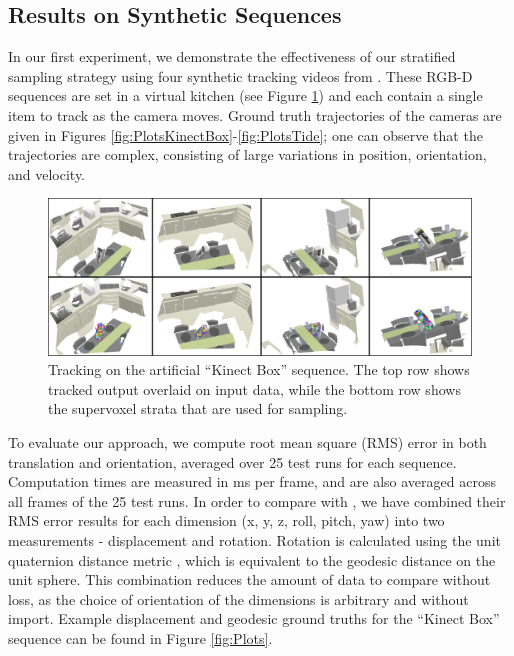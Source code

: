 \subsection{Results on Synthetic Sequences}
In our first experiment, we demonstrate the effectiveness of our stratified sampling strategy using four synthetic tracking videos from \cite{Choi_IROS2013}. These RGB-D sequences are set in a virtual kitchen (see Figure \ref{fig:KinectBoxMontage}) and each contain a single item to track as the camera moves. Ground truth trajectories of the cameras are given in Figures \ref{fig:PlotsKinectBox}-\ref{fig:PlotsTide}; one can observe that the trajectories are complex, consisting of large variations in position, orientation, and velocity.  

\begin{figure}[!ht]
  \centering
  \includegraphics[width=\linewidth]{figures/Tracking/KinectBoxSVMontage.pdf}
  \caption[Tracking on the artificial ``Kinect Box'' sequence.]{Tracking on the artificial ``Kinect Box'' sequence. The top row shows tracked output overlaid on input data, while the bottom row shows the supervoxel strata that are used for sampling.}
  \label{fig:KinectBoxMontage}
\end{figure}


To evaluate our approach, we compute root mean square (RMS) error in both translation and orientation, averaged over 25 test runs for each sequence. Computation times are measured in ms per frame, and are also averaged across all frames of the 25 test runs. In order to compare with \cite{Choi_IROS2013}, we have combined their RMS error results for each dimension (x, y, z, roll, pitch, yaw) into two measurements - displacement and rotation. Rotation is calculated using the unit quaternion distance metric \cite{Kuffner_ICRA2004}, which is equivalent to the geodesic distance on the unit sphere. This combination reduces the amount of data to compare without loss, as the choice of orientation of the dimensions is arbitrary and without import. Example displacement and geodesic ground truths for the ``Kinect Box'' sequence can be found in Figure \ref{fig:Plots}.

